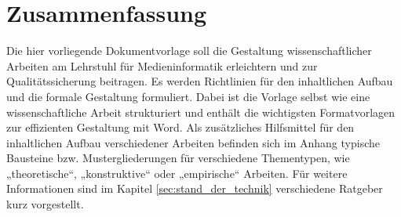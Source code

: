 \chapter{Zusammenfassung}\label{sec:zusammenfassung}

Die hier vorliegende Dokumentvorlage soll die Gestaltung wissenschaftlicher Arbeiten am Lehrstuhl für Medieninformatik erleichtern und zur Qualitätssicherung beitragen. Es werden Richtlinien für den inhaltlichen Aufbau und die formale Gestaltung formuliert. Dabei ist die Vorlage selbst wie eine wissenschaftliche Arbeit strukturiert und enthält die wichtigsten Formatvorlagen zur effizienten Gestaltung mit Word. Als zusätzliches Hilfsmittel für den inhaltlichen Aufbau verschiedener Arbeiten befinden sich im Anhang typische Bausteine bzw. Mustergliederungen für verschiedene Thementypen, wie „theoretische“, „konstruktive“ oder „empirische“ Arbeiten. Für weitere Informationen sind im Kapitel \ref{sec:stand_der_technik} verschiedene Ratgeber kurz vorgestellt. 
